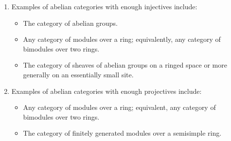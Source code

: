 \begin{theorem} \label{theorem:examples_of_abelian_categories_with_enough_injectives_or_projectives}
\begin{enumerate}
    \item Examples of abelian categories with enough injectives include:
    \begin{itemize}
        \item The category of abelian groups.
        \item Any category of modules over a ring; equivalently, any category of bimodules over two rings.
        \item The category of sheaves of abelian groups on a ringed space or more generally on an essentially small site.
    \end{itemize}

    \item Examples of abelian categories with enough projectives include:
    \begin{itemize}
        \item Any category of modules over a ring; equivalent, any category of bimodules over two rings.
        \item The category of finitely generated modules over a semisimple ring.
    \end{itemize}
\end{enumerate}
\end{theorem}